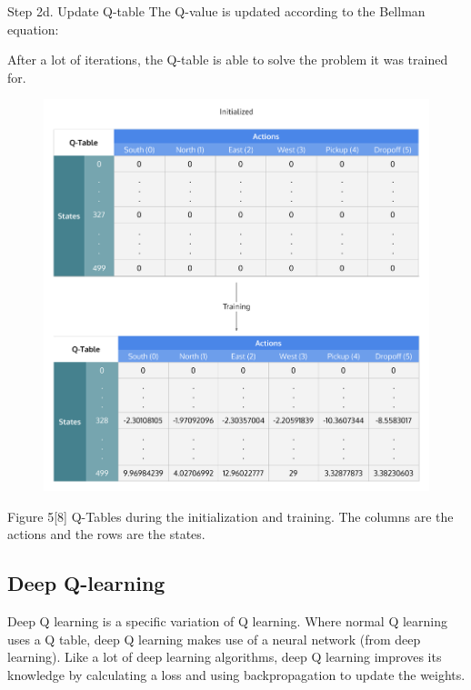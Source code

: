 \documentclass{article}
\begin{document}
\begin{flushleft}
Step 2d. Update Q-table 
The Q-value is updated according to the Bellman equation:
\newline
\end{flushleft}

\begin{flushleft}
After a lot of iterations, the Q-table is able to solve the problem it was trained for.
\end{flushleft}

\begin{figure}
\includegraphics[width=\linewidth]{q_table}
\end{figure}

Figure 5[8] Q-Tables during the initialization and training. The columns are the actions and the rows are the states. 

\subsection{Deep Q-learning}
Deep Q learning is a specific variation of Q learning. Where normal Q learning uses a Q table, deep Q learning makes use of a neural network (from deep learning). Like a lot of deep learning algorithms, deep Q learning improves its knowledge by calculating a loss and using backpropagation to update the weights. 
\end{document}
